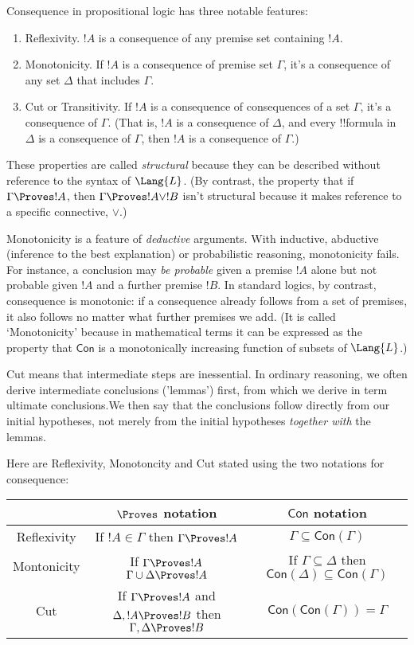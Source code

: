 \documentclass[../../../include/open-logic-section]{subfiles}
\begin{document}
Consequence in propositional logic has three notable features:
\begin{enumerate}
    \item Reflexivity. $!A$ is a consequence of any premise set
    containing $!A$.
    \item Monotonicity. If $!A$ is a consequence of premise set $\Gamma$, 
    it's a consequence of any set $\Delta$ that includes $\Gamma$.
    \item Cut or Transitivity. If $!A$ is a consequence of consequences of
    a set $\Gamma$, it's a consequence of $\Gamma$. (That is, $!A$ is a 
    consequence of $\Delta$, and every !!{formula} in $\Delta$ is a 
    consequence of $\Gamma$, then $!A$ is a consequence of $\Gamma$.)
\end{enumerate}

These properties are called \emph{structural} because they can be 
described without reference to the syntax of $\Lang{L}$. (By contrast,
the property that if $\Gamma\Proves !A$, then $\Gamma\Proves !A\lor!B$
isn't structural because it makes reference to a specific connective, $\lor$.)

\begin{explain}
Monotonicity is a feature of \emph{deductive} arguments. With
inductive, abductive (inference to the best explanation) or
probabilistic reasoning, monotonicity fails. For instance, a
conclusion may \emph{be probable} given a premise $!A$ alone but not
probable given $!A$ and a further premise $!B$. In standard logics, by
contrast, consequence is monotonic: if a consequence already follows
from a set of premises, it also follows no matter what further
premises we add. (It is called `Monotonicity' because in mathematical
terms it can be expressed as the property that $\mathsf{Con}$ is a
monotonically increasing function of subsets of $\Lang{L}$.)

Cut means that intermediate steps are inessential. In ordinary reasoning,
we often derive intermediate conclusions ('lemmas') first, from which
we derive in term ultimate conclusions.We then say that the conclusions
follow directly from our initial hypotheses, not merely from the initial
hypotheses \emph{together with} the lemmas. 
\end{explain}

Here are Reflexivity, Monotoncity and Cut stated using the 
two notations for consequence:

\smallskip \noindent
{\small
\begin{tabular}{ccc}
        & $\Proves$ notation & $\mathsf{Con}$ notation \\
        \hline
    Reflexivity & If $!A\in\Gamma$ then $\Gamma\Proves !A$ & $\Gamma\subseteq\mathsf{Con}(\Gamma)$ \\
    Montonicity & If $\Gamma\Proves !A$
    $\Gamma\cup\Delta\Proves!A$ & If $\Gamma\subseteq\Delta$ then
    $\mathsf{Con}(\Delta)\subseteq\mathsf{Con}(\Gamma)$ \\
    Cut & If $\Gamma\Proves !A$ and $\Delta,!A\Proves !B$ then $\Gamma,\Delta\Proves !B$ & $\mathsf{Con}(\mathsf{Con}(\Gamma))=\Gamma$ \\
\end{tabular}
}
\smallskip
\end{document}
